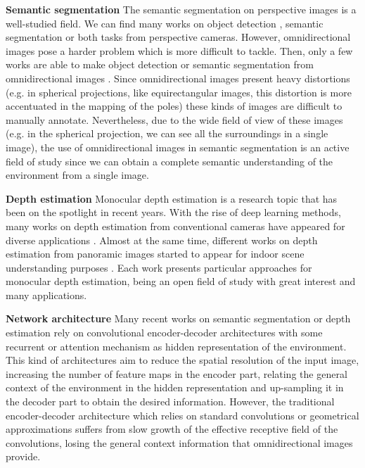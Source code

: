 \documentclass[letterpaper, 10 pt, conference]{ieeeconf}
\begin{document}
\textbf{Semantic segmentation} The semantic segmentation on perspective images is a well-studied field. We can find many works on object detection \cite{russakovsky2015imagenet}, semantic segmentation \cite{he2017mask}\cite{zheng2014dense} or both tasks \cite{dvornik2017blitznet}\cite{girshick2014rich} from perspective cameras. However, omnidirectional images pose a harder problem which is more difficult to tackle. Then, only a few works are able to make object detection or semantic segmentation from omnidirectional images \cite{eder2020tangent}\cite{guerrero2020s}\cite{sun2021hohonet}. 
Since omnidirectional images present heavy distortions (e.g. in spherical projections, like equirectangular images, this distortion is more accentuated in the mapping of the poles) these kinds of images are difficult to manually annotate. Nevertheless, due to the wide field of view of these images (e.g. in the spherical projection, we can see all the surroundings in a single image), the use of omnidirectional images in semantic segmentation is an active field of study since we can obtain a complete semantic understanding of the environment from a single image.

\textbf{Depth estimation} Monocular depth estimation is a research topic that has been on the spotlight in recent years. 
With the rise of deep learning methods, many works on depth estimation from conventional cameras have appeared for diverse applications \cite{facil2019cam}\cite{heo2018monocular}\cite{lee2019monocular}\cite{ranftl2016dense}. Almost at the same time, different works on depth estimation from panoramic images started to appear for indoor scene understanding purposes \cite{pintore2021slicenet}\cite{sun2021hohonet}\cite{wang2020bifuse}\cite{zioulis2018omnidepth}. Each work presents particular approaches for monocular depth estimation, being an open field of study with great interest and many applications. 
 
\textbf{Network architecture} Many recent works on semantic segmentation or depth estimation rely on convolutional encoder-decoder architectures with some recurrent \cite{pintore2021slicenet} or attention mechanism \cite{sun2021hohonet} as hidden representation of the environment. This kind of architectures aim to reduce the spatial resolution of the input image, increasing the number of feature maps in the encoder part, relating the general context of the environment in the hidden representation and up-sampling it in the decoder part to obtain the desired information. 
However, the traditional encoder-decoder architecture which relies on standard convolutions \cite{zioulis2018omnidepth} or geometrical approximations \cite{eder2020tangent} suffers from slow growth of the effective receptive field of the convolutions, losing the general context information that omnidirectional images provide. 
\end{document}
